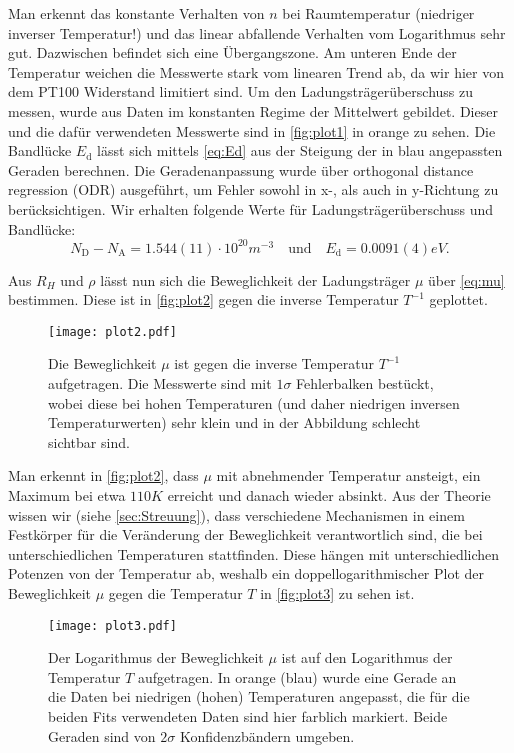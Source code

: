 Man erkennt das konstante Verhalten von $n$ bei Raumtemperatur (niedriger inverser Temperatur!) und das linear abfallende Verhalten vom Logarithmus sehr gut. Dazwischen befindet sich eine Übergangszone. Am unteren Ende der Temperatur weichen die Messwerte stark vom linearen Trend ab, da wir hier von dem PT100 Widerstand limitiert sind. Um den Ladungsträgerüberschuss zu messen, wurde aus Daten im konstanten Regime der Mittelwert gebildet. Dieser und die dafür verwendeten Messwerte sind in \autoref{fig:plot1} in orange zu sehen. Die Bandlücke $E_\mathrm{d}$ lässt sich mittels \autoref{eq:Ed} aus der Steigung der in blau angepassten Geraden berechnen. Die Geradenanpassung wurde über orthogonal distance regression (ODR) \autocite{odr} ausgeführt, um Fehler sowohl in x-, als auch in y-Richtung zu berücksichtigen. Wir erhalten folgende Werte für Ladungsträgerüberschuss und Bandlücke:
$$ N_\mathrm{D} - N_\mathrm{A} = 1.544(11) \cdot 10^{20} \unit{m^{-3}} \quad\text{und}\quad E_\mathrm{d} = 0.0091(4) \unit{eV} .$$

Aus $R_H$ und $\rho$ lässt nun sich die Beweglichkeit der Ladungsträger $\mu$ über \autoref{eq:mu} bestimmen. Diese ist in \autoref{fig:plot2} gegen die inverse Temperatur $T^{-1}$ geplottet.

\begin{figure}[H]
    \centering
    \texttt{[image: plot2.pdf]}
    \caption{Die Beweglichkeit $\mu$ ist gegen die inverse Temperatur $T^{-1}$ aufgetragen. Die Messwerte sind mit $1\sigma$ Fehlerbalken bestückt, wobei diese bei hohen Temperaturen (und daher niedrigen inversen Temperaturwerten) sehr klein und in der Abbildung schlecht sichtbar sind.}
    \label{fig:plot2}
\end{figure}

Man erkennt in \autoref{fig:plot2}, dass $\mu$ mit abnehmender Temperatur ansteigt, ein Maximum bei etwa $110 \unit{K}$ erreicht und danach wieder absinkt. Aus der Theorie wissen wir (siehe \autoref{sec:Streuung}), dass verschiedene Mechanismen in einem Festkörper für die Veränderung der Beweglichkeit verantwortlich sind, die bei unterschiedlichen Temperaturen stattfinden. Diese hängen mit unterschiedlichen Potenzen von der Temperatur ab, weshalb ein doppellogarithmischer Plot der Beweglichkeit $\mu$ gegen die Temperatur $T$ in \autoref{fig:plot3} zu sehen ist.

\begin{figure}[H]
    \centering
    \texttt{[image: plot3.pdf]}
    \caption{Der Logarithmus der Beweglichkeit $\mu$ ist auf den Logarithmus der Temperatur $T$ aufgetragen. In orange (blau) wurde eine Gerade an die Daten bei niedrigen (hohen) Temperaturen angepasst, die für die beiden Fits verwendeten Daten sind hier farblich markiert. Beide Geraden sind von $2\sigma$ Konfidenzbändern umgeben.}
    \label{fig:plot3}
\end{figure}

